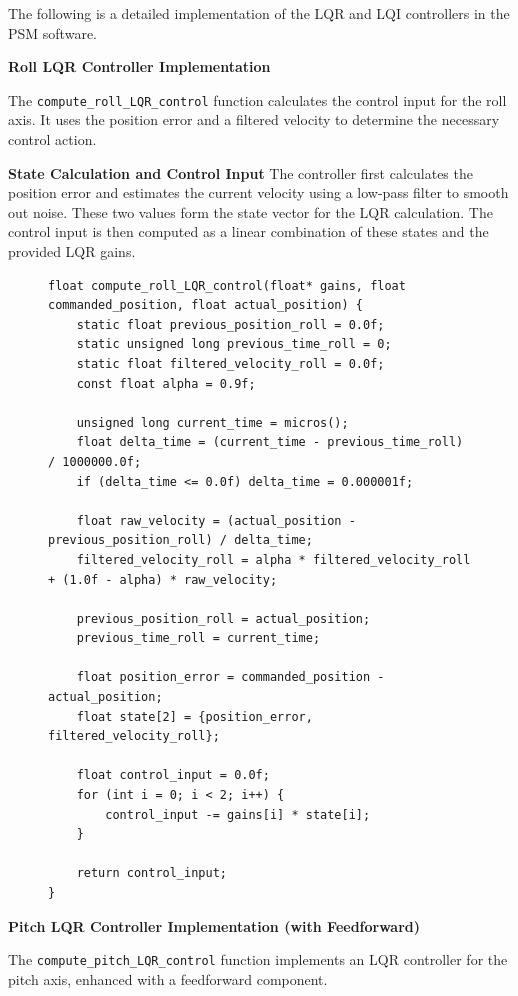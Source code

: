 The following is a detailed implementation of the LQR and LQI controllers in the PSM software. 

\textbf{Roll LQR Controller Implementation}

The \texttt{compute\_roll\_LQR\_control} function calculates the control input for the roll axis. It uses the position error and a filtered velocity to determine the necessary control action.

\textbf{State Calculation and Control Input}
The controller first calculates the position error and estimates the current velocity using a low-pass filter to smooth out noise. These two values form the state vector for the LQR calculation. The control input is then computed as a linear combination of these states and the provided LQR gains.

\begin{figure}[H]
\centering
\begin{lstlisting}[caption={Roll LQR Control Input Calculation}, label={lst:roll_lqr_control}]
float compute_roll_LQR_control(float* gains, float commanded_position, float actual_position) {
    static float previous_position_roll = 0.0f;
    static unsigned long previous_time_roll = 0;
    static float filtered_velocity_roll = 0.0f;
    const float alpha = 0.9f;

    unsigned long current_time = micros();
    float delta_time = (current_time - previous_time_roll) / 1000000.0f;
    if (delta_time <= 0.0f) delta_time = 0.000001f;

    float raw_velocity = (actual_position - previous_position_roll) / delta_time;
    filtered_velocity_roll = alpha * filtered_velocity_roll + (1.0f - alpha) * raw_velocity;

    previous_position_roll = actual_position;
    previous_time_roll = current_time;

    float position_error = commanded_position - actual_position;
    float state[2] = {position_error, filtered_velocity_roll};

    float control_input = 0.0f;
    for (int i = 0; i < 2; i++) {
        control_input -= gains[i] * state[i];
    }

    return control_input;
}
\end{lstlisting}
\end{figure}

\textbf{Pitch LQR Controller Implementation (with Feedforward)}

The \texttt{compute\_pitch\_LQR\_control} function implements an LQR controller for the pitch axis, enhanced with a feedforward component.

